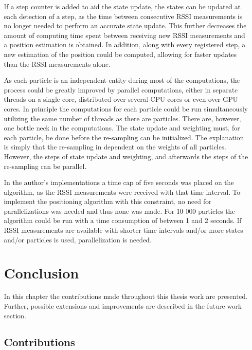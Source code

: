 \documentclass{LTHthesis}
\begin{document}
If a step counter is added to aid the state update, the states can be updated at each detection of a step, as the time between consecutive RSSI measurements is no longer needed to perform an accurate state update. This further decreases the amount of computing time spent between receiving new RSSI measurements and a position estimation is obtained. In addition, along with every registered step, a new estimation of the position could be computed, allowing for faster updates than the RSSI measurements alone. 

As each particle is an independent entity during most of the computations, the process could be greatly improved by parallel computations, either in separate threads on a single core, distributed over several CPU cores or even over GPU cores. In principle the computations for each particle could be run simultaneously utilizing the same number of threads as there are particles. There are, however, one bottle neck in the computations. The state update and weighting must, for each particle, be done before the re-sampling can be initialized. The explanation is simply that the re-sampling in dependent on the weights of all particles. However, the steps of state update and weighting, and afterwards the steps of the re-sampling can be parallel. 

In the author's implementations a time cap of five seconds was placed on the algorithm, as the RSSI measurements were received with that time interval. To implement the positioning algorithm with this constraint, no need for parallelizations was needed and thus none was made. For 10 000 particles the algorithm could be run with a time consumption of between 1 and 2 seconds. If RSSI measurements are available with shorter time intervals and/or more states and/or particles is used, parallelization is needed.     
%

\chapter{Conclusion}
%
In this chapter the contributions made throughout this thesis work are presented. Further, possible extensions and improvements are described in the future work section.
%
\label{chap:conclusion}


\section{Contributions}
\end{document}
